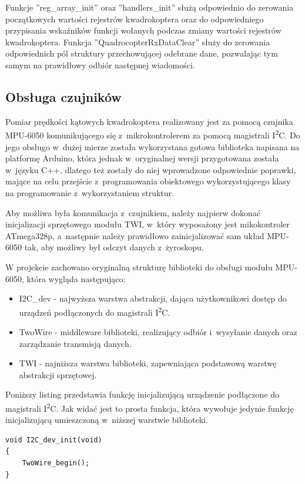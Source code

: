 Funkcje ''reg\_array\_init'' oraz ''handlers\_init'' służą odpowiednio do zerowania początkowych wartości rejestrów kwadrokoptera oraz do odpowiedniego przypisania wskaźników funkcji wołanych podczas zmiany wartości rejestrów kwadrokoptera. Funkcja ''QuadrocopterRxDataClear'' służy do zerowania odpowiednich pól struktury przechowującej odebrane dane, pozwalając tym samym na prawidłowy odbiór następnej wiadomości.

\subsection{Obsługa czujników}

Pomiar prędkości kątowych kwadrokoptera realizowany jest za pomocą czujnika MPU-6050 komunikującego się z~mikrokontrolerem za pomocą magistrali I\textsuperscript{2}C. Do jego obsługo w~dużej mierze została wykorzystana gotowa biblioteka napisana na platformę Arduino, która jednak w~oryginalnej wersji przygotowana została w~języku C++, dlatego też zostały do niej wprowadzone odpowiednie poprawki, mające na celu przejście z~programowania obiektowego wykorzystującego klasy na programowanie z~wykorzystaniem struktur. 

Aby możliwa była komunikacja z~czujnikiem, należy najpierw dokonać inicjalizacji sprzętowego modułu TWI, w~który wyposażony jest mikokontroler ATmega328p, a~następnie należy prawidłowo zainicjalizować sam układ MPU-6050 tak, aby możliwy był odczyt danych z~żyroskopu.

W projekcie zachowano oryginalną strukturę biblioteki do obsługi modułu MPU-6050, która wygląda następująco:
\begin{itemize}
	\item I2C\_dev - najwyższa warstwa abstrakcji, dająca użytkownikowi dostęp do urządzeń podłączonych do magistrali I\textsuperscript{2}C.
	\item TwoWire - middleware biblioteki, realizujący odbiór i~wysyłanie danych oraz zarządzanie transmisją danych.
	\item TWI - najniższa warstwa biblioteki, zapewniająca podstawową warstwę abstrakcji sprzętowej.
\end{itemize}

Poniższy listing przedstawia funkcję inicjalizującą urządzenie podłączone do magistrali I\textsuperscript{2}C. Jak widać jest to prosta funkcja, która wywołuje jedynie funkcję inicjalizującą umieszczoną w~niższej warstwie biblioteki.

\begin{lstlisting}
void I2C_dev_init(void)
{
	TwoWire_begin();
}
\end{lstlisting}

